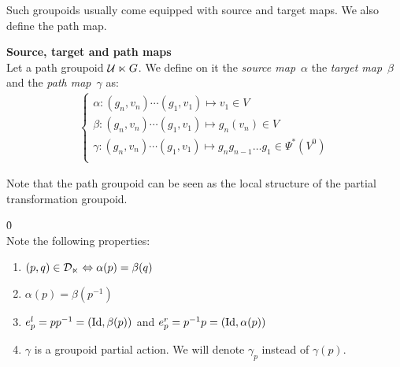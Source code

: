 Such groupoids usually come equipped with source and target maps. We also define the path map.

\begin{definition}\textbf{Source, target and path maps}\\
Let a path groupoid $\mathcal{U} \ltimes G$. We define on it the \emph{source map}~$\alpha$ the \emph{target map}~$\beta$ and the \emph{path map}~$\gamma$ as:
\begin{gather*}
\begin{cases}
  \alpha: (g_n,v_n) \cdots (g_1,v_1) \mapsto v_1 \in V\\
  \beta: (g_n,v_n) \cdots (g_1,v_1) \mapsto g_n(v_n) \in V\\
  \gamma: (g_n,v_n) \cdots (g_1,v_1) \mapsto g_ng_{n-1}\ldots g_1 \in \Psi^*(V^0)\\
\end{cases}
\end{gather*}
\end{definition}

\begin{remark}%
Note that the path groupoid can be seen as the local structure of the partial transformation groupoid.
\end{remark}

\begin{lemma}\h{0}\\
Note the following properties:
\begin{enumerate}
  \item $(p,q) \in \mathcal{D}_{\ltimes} \Leftrightarrow \alpha(p) = \beta(q)$
  \item $\alpha(p) = \beta(p^{-1})$
  \item $e^l_p=pp^{-1} = (\operatorname{Id}, \beta(p))$ and $e^r_p=p^{-1}p = (\operatorname{Id}, \alpha(p))$
  \item $\gamma$ is a groupoid partial action. We will denote $\gamma_p$ instead of $\gamma(p)$. \label{enum:3}
\end{enumerate}
\end{lemma}

